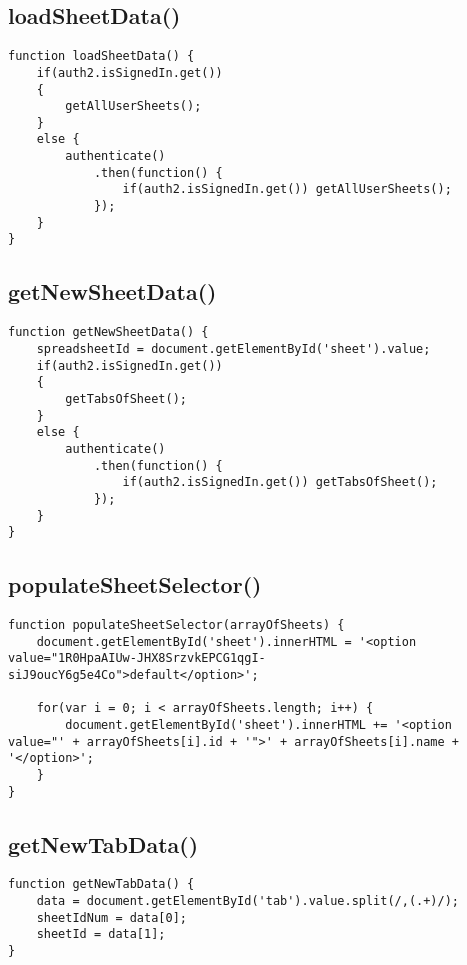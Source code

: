 \documentclass[letterpaper]{article}
\begin{document}
\subsection{loadSheetData()}

\begin{lstlisting}[firstnumber=7]
function loadSheetData() {
    if(auth2.isSignedIn.get())
    {
        getAllUserSheets();
    }
    else {
        authenticate()
            .then(function() {
                if(auth2.isSignedIn.get()) getAllUserSheets();
            });
    }
}
\end{lstlisting}

\subsection{getNewSheetData()}

\begin{lstlisting}[firstnumber=20]
function getNewSheetData() {
    spreadsheetId = document.getElementById('sheet').value;
    if(auth2.isSignedIn.get())
    {
        getTabsOfSheet();
    }
    else {
        authenticate()
            .then(function() {
                if(auth2.isSignedIn.get()) getTabsOfSheet();
            });
    }
}
\end{lstlisting}

\subsection{populateSheetSelector()}

\begin{lstlisting}[firstnumber=34]
function populateSheetSelector(arrayOfSheets) {
    document.getElementById('sheet').innerHTML = '<option value="1R0HpaAIUw-JHX8SrzvkEPCG1qgI-siJ9oucY6g5e4Co">default</option>';

    for(var i = 0; i < arrayOfSheets.length; i++) {
        document.getElementById('sheet').innerHTML += '<option value="' + arrayOfSheets[i].id + '">' + arrayOfSheets[i].name + '</option>';
    }
}
\end{lstlisting}

\subsection{getNewTabData()}

\begin{lstlisting}[firstnumber=42]
function getNewTabData() {
    data = document.getElementById('tab').value.split(/,(.+)/);
    sheetIdNum = data[0];
    sheetId = data[1];
}
\end{lstlisting}
\end{document}
